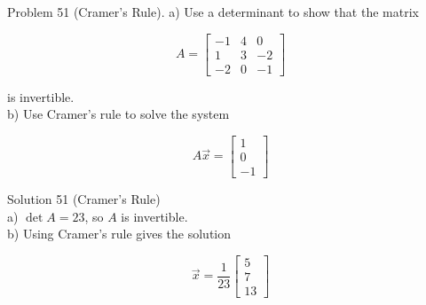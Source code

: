 \documentclass[10pt]{article}
\begin{document}
Problem 51 (Cramer's Rule). a) Use a determinant to show that the matrix

$$
A=\left[\begin{array}{ccc}
-1 & 4 & 0 \\
1 & 3 & -2 \\
-2 & 0 & -1
\end{array}\right]
$$

is invertible.\\
b) Use Cramer's rule to solve the system

$$
A \vec{x}=\left[\begin{array}{c}
1 \\
0 \\
-1
\end{array}\right]
$$

Solution 51 (Cramer's Rule)\\
a) $\operatorname{det} A=23$, so $A$ is invertible.\\
b) Using Cramer's rule gives the solution

$$
\vec{x}=\frac{1}{23}\left[\begin{array}{c}
5 \\
7 \\
13
\end{array}\right]
$$
\end{document}
